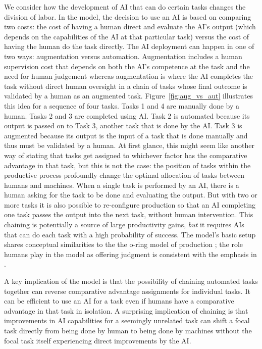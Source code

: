\documentclass{article}
\theoremstyle{plain}
\theoremstyle{plain}
\begin{document}
We consider how the development of AI that can do certain tasks changes the division of labor.
In the model, the decision to use an AI is based on comparing two costs: the cost of having a human direct and evaluate the AI's output (which depends on the capabilities of the AI at that particular task) versus the cost of having the human do the task directly.
The AI deployment can happen in one of two ways: augmentation versus automation.
Augmentation includes a human supervision cost that depends on both the AI's competence at the task and the need for human judgement whereas augmentation is where the AI completes the task without direct human oversight in a chain of tasks whose final outcome is validated by a human as an augmented task.
Figure~\ref{fig:aug_vs_aut} illustrates this idea for a sequence of four tasks.
Tasks 1 and 4 are manually done by a human.
Tasks 2 and 3 are completed using AI.
Task 2 is automated because its output is passed on to Task 3, another task that is done by the AI. 
Task 3 is augmented because its output is the input of a task that is done manually and thus must be validated by a human.
At first glance, this might seem like another way of stating that tasks get assigned to whichever factor has the comparative advantage in that task, but this is not the case: the position of tasks within the productive process profoundly change the optimal allocation of tasks between humans and machines. When a single task is performed by an AI, there is a human asking for the task to be done and evaluating the output.
But with two or more tasks it is also possible to re-configure production so that an AI completing one task passes the output into the next task, without human intervention.
This chaining is potentially a source of large productivity gains, \emph{but} it requires AIs that can do each task with a high probability of success. 
The model's basic setup shares conceptual similarities to the the o-ring model of production \citep{kremer1993}; the role humans play in the model as offering judgment is consistent with the emphasis in \cite{agrawal2019exploring}.

A key implication of the model is that the possibility of chaining automated tasks together can reverse comparative advantage assignments for individual tasks. 
It can be efficient to use an AI for a task even if humans have a comparative advantage in that task in isolation.
A surprising implication of chaining is that improvements in AI capabilities for a seemingly unrelated task can shift a focal task directly from being done by human to being done by machines without the focal task itself experiencing direct improvements by the AI.
\end{document}

